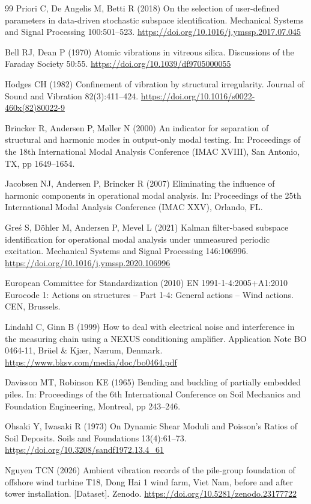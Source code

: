 \documentclass[11pt]{article}
\begin{document}
\begin{thebibliography}{99}
Priori C, De Angelis M, Betti R (2018) On the selection of user-defined parameters in data-driven stochastic subspace identification. Mechanical Systems and Signal Processing 100:501--523. \url{https://doi.org/10.1016/j.ymssp.2017.07.045}

Bell RJ, Dean P (1970) Atomic vibrations in vitreous silica. Discussions of the Faraday Society 50:55. \url{https://doi.org/10.1039/df9705000055}

Hodges CH (1982) Confinement of vibration by structural irregularity. Journal of Sound and Vibration 82(3):411--424. \url{https://doi.org/10.1016/s0022-460x(82)80022-9}

Brincker R, Andersen P, M{\o}ller N (2000) An indicator for separation of structural and harmonic modes in output-only modal testing. In: Proceedings of the 18th International Modal Analysis Conference (IMAC XVIII), San Antonio, TX, pp 1649--1654.

Jacobsen NJ, Andersen P, Brincker R (2007) Eliminating the influence of harmonic components in operational modal analysis. In: Proceedings of the 25th International Modal Analysis Conference (IMAC XXV), Orlando, FL.

Gre{\'s} S, D{\"o}hler M, Andersen P, Mevel L (2021) Kalman filter-based subspace identification for operational modal analysis under unmeasured periodic excitation. Mechanical Systems and Signal Processing 146:106996. \url{https://doi.org/10.1016/j.ymssp.2020.106996}

European Committee for Standardization (2010) EN 1991-1-4:2005+A1:2010 Eurocode 1: Actions on structures -- Part 1-4: General actions -- Wind actions. CEN, Brussels.

Lindahl C, Ginn B (1999) How to deal with electrical noise and interference in the measuring chain using a NEXUS conditioning amplifier. Application Note BO 0464-11, Br{\"u}el \& Kj{\ae}r, N{\ae}rum, Denmark. \url{https://www.bksv.com/media/doc/bo0464.pdf}

Davisson MT, Robinson KE (1965) Bending and buckling of partially embedded piles. In: Proceedings of the 6th International Conference on Soil Mechanics and Foundation Engineering, Montreal, pp 243--246.

Ohsaki Y, Iwasaki R (1973) On Dynamic Shear Moduli and Poisson's Ratios of Soil Deposits. Soils and Foundations 13(4):61--73. \url{https://doi.org/10.3208/sandf1972.13.4_61}

Nguyen TCN (2026) Ambient vibration records of the pile-group foundation of offshore wind turbine T18, Dong Hai 1 wind farm, Viet Nam, before and after tower installation. [Dataset]. Zenodo. \url{https://doi.org/10.5281/zenodo.23177722}

\end{thebibliography}
\end{document}
